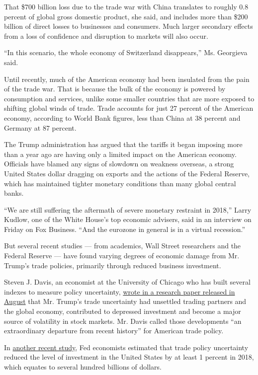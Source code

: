 That \$700 billion loss due to the trade war with China translates to
roughly 0.8 percent of global gross domestic product, she said, and
includes more than \$200 billion of direct losses to businesses and
consumers. Much larger secondary effects from a loss of confidence and
disruption to markets will also occur.

``In this scenario, the whole economy of Switzerland disappears,'' Ms.
Georgieva said.

Until recently, much of the American economy had been insulated from the
pain of the trade war. That is because the bulk of the economy is
powered by consumption and services, unlike some smaller countries that
are more exposed to shifting global winds of trade. Trade accounts for
just 27 percent of the American economy, according to World Bank
figures, less than China at 38 percent and Germany at 87 percent.

The Trump administration has argued that the tariffs it began imposing
more than a year ago are having only a limited impact on the American
economy. Officials have blamed any signs of slowdown on weakness
overseas, a strong United States dollar dragging on exports and the
actions of the Federal Reserve, which has maintained tighter monetary
conditions than many global central banks.

``We are still suffering the aftermath of severe monetary restraint in
2018,'' Larry Kudlow, one of the White House's top economic advisers,
said in an interview on Friday on Fox Business. ``And the eurozone in
general is in a virtual recession.''

But several recent studies --- from academics, Wall Street researchers
and the Federal Reserve --- have found varying degrees of economic
damage from Mr. Trump's trade policies, primarily through reduced
business investment.

Steven J. Davis, an economist at the University of Chicago who has built
several indexes to measure policy uncertainty,
\href{http://www.policyuncertainty.com/media/Rising\%20Policy\%20Uncertainty.pdf}{wrote
in a research paper released in August} that Mr. Trump's trade
uncertainty had unsettled trading partners and the global economy,
contributed to depressed investment and become a major source of
volatility in stock markets. Mr. Davis called those developments ``an
extraordinary departure from recent history'' for American trade policy.

In
\href{https://www2.bc.edu/matteo-iacoviello/research_files/TPU_PAPER.pdf}{another
recent study}, Fed economists estimated that trade policy uncertainty
reduced the level of investment in the United States by at least 1
percent in 2018, which equates to several hundred billions of dollars.

